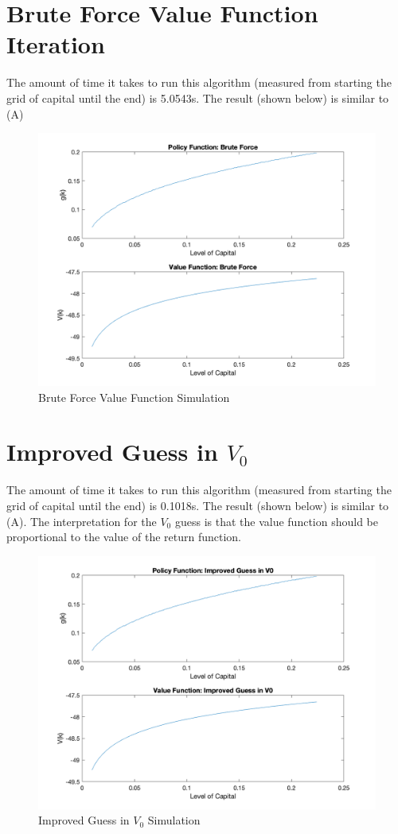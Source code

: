\documentclass[letter,10.5pt]{article}
\begin{document}
\section{Brute Force Value Function Iteration}
The amount of time it takes to run this algorithm (measured from starting the grid of capital until the end) is 5.0543s. The result (shown below) is similar to (A)
\begin{figure}[hbtp]
\centering
\caption{Brute Force Value Function Simulation}
\includegraphics[scale=0.27]{part_b.png}
\end{figure}


\section{Improved Guess in $V_0$}

The amount of time it takes to run this algorithm (measured from starting the grid of capital until the end) is 0.1018s. The result (shown below) is similar to (A). The interpretation for the $V_0$ guess is that the value function should be proportional to the value of the return function. 
\begin{figure}[hbtp]
\centering
\caption{Improved Guess in $V_0$ Simulation}
\includegraphics[scale=0.27]{part_c.png}
\end{figure}
\end{document}
